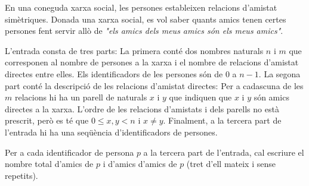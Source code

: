 
\UsePython

\Statement

En una coneguda xarxa social, les persones estableixen relacions d'amistat simètriques. Donada una xarxa social, es vol saber quants amics tenen certes persones fent servir allò de \emph{"els amics dels meus amics són els meus amics"}.

\Input

L'entrada consta de tres parts: La primera conté dos nombres naturals $n$ i $m$ que corres\-ponen al nombre de persones a la xarxa i el nombre de relacions d'amistat directes entre elles. Els identificadors de les persones són de 0 a $n-1$. La segona part conté la descripció de les relacions d'amistat directes: Per a cadascuna de les $m$ relacions hi ha un parell de naturals $x$ i $y$ que indiquen que $x$ i $y$ són amics directes a la xarxa. L'ordre de les relacions d'amistats i dels parells no està prescrit, però es té que $0\le x,y<n$ i $x\neq y$. Finalment, a la tercera part de l'entrada hi ha una seqüència d'identificadors de persones. 

\Output

Per a cada identificador de persona $p$ a la tercera part de l'entrada, cal escriure el nombre total d'amics de $p$ i d'amics d'amics de $p$ (tret d'ell mateix
i sense repetits).

\Sample